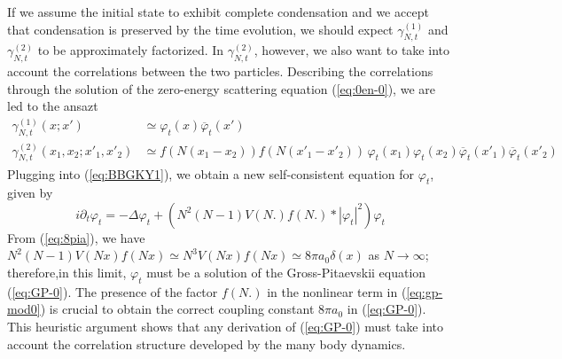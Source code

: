 \documentclass[11pt,a4paper,DIV11]{scrartcl}	%
\begin{document}
If we assume the initial state to exhibit complete condensation and we accept that condensation is preserved by the time evolution, we should expect $\gamma^{(1)}_{N,t}$ and $\gamma^{(2)}_{N,t}$ to be approximately factorized. In $\gamma^{(2)}_{N,t}$, however, we also want to take into account the correlations between the two particles. Describing the correlations through the solution of the zero-energy scattering equation (\ref{eq:0en-0}), we are led to the ansazt
%
\begin{equation}\label{eq:ans-mod} \begin{split} 
\gamma^{(1)}_{N,t} (x;x') &\simeq \varphi_t (x) \overline{\varphi}_t (x') \\
\gamma^{(2)}_{N,t} (x_1, x_2; x'_1, x'_2) &\simeq  f (N (x_1 - x_2)) f (N (x'_1- x'_2)) \, \varphi_t (x_1)  \varphi_t (x_2) \overline{\varphi}_t (x'_1) \overline{\varphi}_t (x'_2)
\end{split} \end{equation}
Plugging into (\ref{eq:BBGKY1}), we obtain a new self-consistent equation for $\varphi_t$,  given by
\begin{equation}\label{eq:gp-mod0} i\partial_t \varphi_t = -\Delta \varphi_t + \left(N^2 (N-1) V(N.) f(N.) * |\varphi_t|^2 \right) \varphi_t
\end{equation}
{F}rom (\ref{eq:8pia}), we have $N^2 (N-1) V(Nx) f(Nx) \simeq N^3 V(Nx) f(Nx) \simeq 8\pi a_0 \delta (x)$ as $N \to \infty$; therefore,in this limit, $\varphi_t$ must be a solution of the Gross-Pitaevskii equation (\ref{eq:GP-0}). The presence of the factor $f(N.)$ in the nonlinear term in (\ref{eq:gp-mod0}) is crucial to obtain the correct coupling constant $8\pi a_0$ in (\ref{eq:GP-0}). This heuristic argument shows that any derivation of (\ref{eq:GP-0}) must take into account the correlation structure developed by the many body dynamics. 
 
\end{document}
